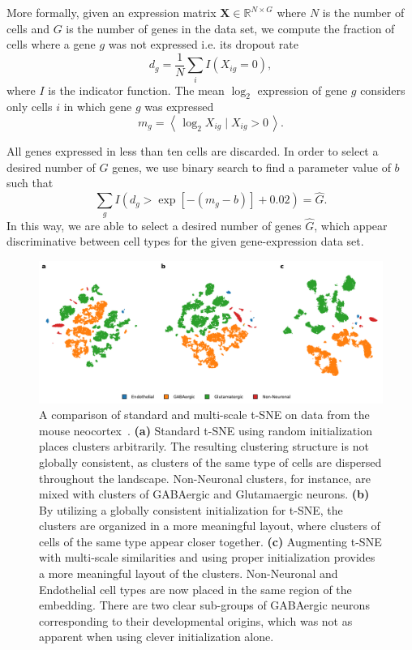 \documentclass[runningheads]{llncs}
\begin{document}
More formally, given an expression matrix $\mathbf{X} \in \mathbb{R}^{N \times
G}$ where $N$ is the number of cells and $G$ is the number of genes in the data
set, we compute the fraction of cells where a gene $g$ was not expressed i.e.
its dropout rate
\begin{equation}
d_g = \frac{1}{N} \sum_i I \left ( X_{ig} = 0\right ),
\end{equation}
where $I$ is the indicator function. The mean $\log_2$ expression of gene $g$
considers only cells $i$ in which gene $g$ was expressed
\begin{equation}
m_g = \left \langle \, \log_2 X_{ig} \mid X_{ig} > 0 \, \right \rangle.
\end{equation}

All genes expressed in less than ten cells are discarded. In order to select a
desired number of $\hat{G}$ genes, we use binary search to find a parameter
value of $b$ such that
\begin{equation}
\sum_g I \left (d_g > \exp \left [ -(m_g - b) \right ] + 0.02 \right ) = \hat{G}.
\end{equation}
In this way, we are able to select a desired number of genes $\hat{G}$, which
appear discriminative between cell types for the given gene-expression data set.

\newpage

\begin{figure}[htbp]
  \includegraphics[width=\textwidth]{tasic_multiscale.pdf}
  \caption{A comparison of standard and multi-scale t-SNE on data from the
  mouse neocortex~\cite{Tasic2018}. {\bf (a)} Standard t-SNE using random 
  initialization places clusters arbitrarily. The resulting clustering structure is not globally consistent,
  as clusters of the same type of cells are dispersed throughout the landscape. Non-Neuronal clusters, for instance, are mixed with clusters of GABAergic and Glutamaergic neurons.
  {\bf (b)} By utilizing a globally consistent initialization for t-SNE, the clusters
  are organized in a more meaningful layout, where clusters of cells of the same type appear closer together.
  {\bf (c)} Augmenting t-SNE with multi-scale
  similarities and using proper initialization provides a more meaningful
  layout of the clusters. Non-Neuronal and Endothelial cell types are now placed in
  the same region of the embedding. There are two clear sub-groups of GABAergic
  neurons corresponding to their developmental origins, which was not as apparent
  when using clever initialization alone.}
  \label{fig:multiscale}
\end{figure}
\end{document}
